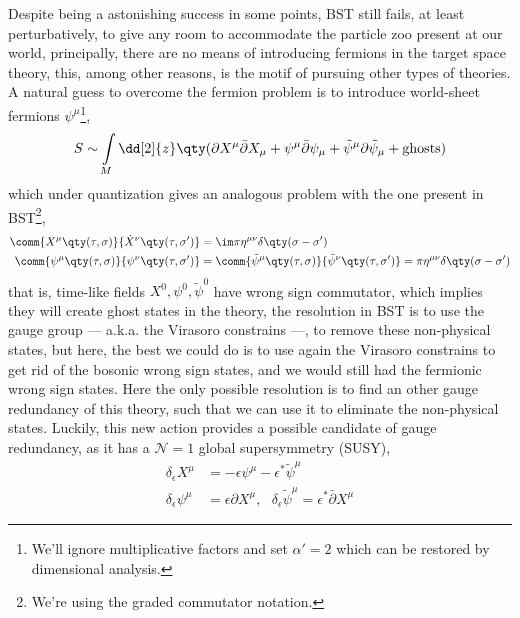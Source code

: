 Despite being a astonishing success in some points, BST still fails, at least perturbatively, to give 
any room to accommodate the particle zoo present at our world, principally, there are no means of 
introducing fermions in the target space theory, this, among other reasons, is the motif of pursuing other 
types of theories. A natural guess to overcome the fermion problem is to introduce world-sheet fermions $\psi^\mu$\cite{polchinski:vol2,witten:vol1}\footnote{We'll ignore multiplicative 
factors and set $\alpha'=2$ which can be restored by dimensional analysis.}, 
\begin{align}
    S\sim\int\limits_M\dd[2]{z}\qty(\partial X^\mu\bar\partial X_\mu+\psi^\mu\bar\partial\psi_{\mu}+{\tilde\psi}^\mu\partial{\tilde\psi}_{\mu}+\textnormal{ghosts})\label{action:sst1}
\end{align}
which under quantization gives an analogous problem with the one present in BST\footnote{We're using the graded commutator notation.},
\begin{align*}
    \comm{X^\mu\qty(\tau,\sigma)}{\dot X^\nu\qty(\tau,\sigma')}&=\im\pi\eta^{\mu\nu}\delta\qty(\sigma-\sigma')\\
    \comm{\psi^\mu\qty(\tau,\sigma)}{\psi^\nu\qty(\tau,\sigma')}&=\comm{{\tilde\psi}^\mu\qty(\tau,\sigma)}{{\tilde\psi}^\nu\qty(\tau,\sigma')}=\pi\eta^{\mu\nu}\delta\qty(\sigma-\sigma')
\end{align*}
that is, time-like fields $X^0,\psi^0,{\tilde\psi}^0$ have wrong sign commutator, which implies they will create ghost states in 
the theory, the resolution in BST is to use the gauge group --- a.k.a. the Virasoro constrains ---, to remove 
these non-physical states, but here, the best we could do is to use again the Virasoro constrains to get rid of the 
bosonic wrong sign states, and we would still had the fermionic wrong sign states. Here the only possible resolution 
is to find an other gauge redundancy of this theory, such that we can use it to eliminate the non-physical states. 
Luckily, this new action provides a possible candidate of gauge redundancy, as it has a $\mathcal N=1$ global supersymmetry (SUSY),\begin{subequations}
\begin{align}
    \delta_\epsilon X^\mu&=-\epsilon\psi^\mu-\epsilon^\ast{\tilde\psi^\mu}\\
    \delta_\epsilon\psi^\mu&=\epsilon\partial X^\mu,\ \ \ \delta_\epsilon{\tilde\psi}^\mu=\epsilon^\ast\bar\partial X^\mu
\end{align}\label{susy:pol1}\end{subequations}
